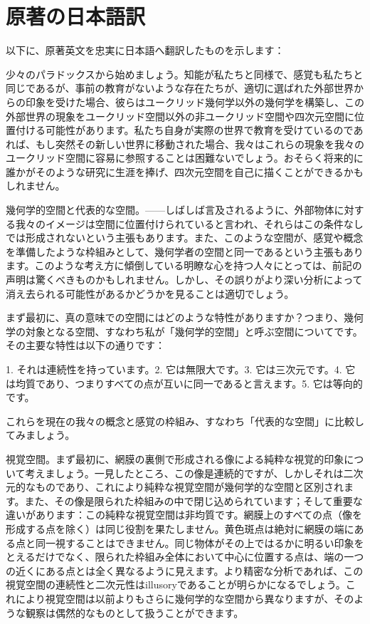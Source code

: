 \documentclass[a4paper,11pt,openany]{ltjsbook}
\begin{document}
\section{原著の日本語訳}
以下に、原著英文を忠実に日本語へ翻訳したものを示します：

少々のパラドックスから始めましょう。知能が私たちと同様で、感覚も私たちと同じであるが、事前の教育がないような存在たちが、適切に選ばれた外部世界からの印象を受けた場合、彼らはユークリッド幾何学以外の幾何学を構築し、この外部世界の現象をユークリッド空間以外の非ユークリッド空間や四次元空間に位置付ける可能性があります。私たち自身が実際の世界で教育を受けているのであれば、もし突然その新しい世界に移動された場合、我々はこれらの現象を我々のユークリッド空間に容易に参照することは困難ないでしょう。おそらく将来的に誰かがそのような研究に生涯を捧げ、四次元空間を自己に描くことができるかもしれません。

幾何学的空間と代表的な空間。——しばしば言及されるように、外部物体に対する我々のイメージは空間に位置付けられていると言われ、それらはこの条件なしでは形成されないという主張もあります。また、このような空間が、感覚や概念を準備したような枠組みとして、幾何学者の空間と同一であるという主張もあります。このような考え方に傾倒している明瞭な心を持つ人々にとっては、前記の声明は驚くべきものかもしれません。しかし、その誤りがより深い分析によって消え去られる可能性があるかどうかを見ることは適切でしょう。

まず最初に、真の意味での空間にはどのような特性がありますか？つまり、幾何学の対象となる空間、すなわち私が「幾何学的空間」と呼ぶ空間についてです。その主要な特性は以下の通りです：

1. それは連続性を持っています。2. 它は無限大です。3. 它は三次元です。4. 它は均質であり、つまりすべての点が互いに同一であると言えます。5. 它は等向的です。

これらを現在の我々の概念と感覚の枠組み、すなわち「代表的な空間」に比較してみましょう。

視覚空間。まず最初に、網膜の裏側で形成される像による純粋な視覚的印象について考えましょう。一見したところ、この像是連続的ですが、しかしそれは二次元的なものであり、これにより純粋な視覚空間が幾何学的な空間と区別されます。また、その像是限られた枠組みの中で閉じ込められています；そして重要な違いがあります：この純粋な視覚空間は非均質です。網膜上のすべての点（像を形成する点を除く）は同じ役割を果たしません。黄色斑点は絶対に網膜の端にある点と同一視することはできません。同じ物体がその上ではるかに明るい印象をとえるだけでなく、限られた枠組み全体において中心に位置する点は、端の一つの近くにある点とは全く異なるように見えます。より精密な分析であれば、この視覚空間の連続性と二次元性はillusoryであることが明らかになるでしょう。これにより視覚空間は以前よりもさらに幾何学的な空間から異なりますが、そのような観察は偶然的なものとして扱うことができます。
\end{document}
